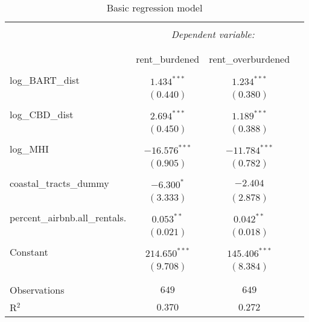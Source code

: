 \documentclass[10pt, letterpaper]{amsart}
\begin{document}
\begin{table}[!htbp] \centering 
  \caption{Basic regression model} 
  \label{} 
  \begin{tabular}{lccc} 
    \\
    [-1.8ex]        \hline \hline \hline \\
    [-1.8ex]        & \multicolumn{2}{c}{\textit{Dependent variable:}} \\
                                  \cline{2-3}\\     
    \\[-1.8ex]      & rent\_burdened & rent\_overburdened\\ 
                    \hline \\[-1.8ex] 
    
    log\_BART\_dist & $1.434^{***}$   & $1.234^{***}$       \\ 
                    & $(0.440)$       & $(0.380)$           \\ 
    & \\ 
    log\_CBD\_dist  & $2.694^{***}$   & $1.189^{***}$       \\ 
                    & $(0.450)$       & $(0.388)$           \\ 
    & \\ 
    log\_MHI        & $-16.576^{***}$ & $-11.784^{***}$     \\ 
                    & $(0.905)$       & $(0.782)$           \\ 
    & \\ 
    coastal\_tracts\_dummy
                    & $-6.300^*$      & $-2.404$            \\ 
                    & $(3.333)$       & $(2.878)$           \\ 
    & \\ 
    percent\_airbnb.all\_rentals.
                    & $0.053^{**}$    & $0.042^{**}$        \\ 
                    & $(0.021)$       & $(0.018)$           \\ 
    & \\ 
    Constant        & $214.650^{***}$ & $145.406^{***}$     \\ 
                    & $(9.708)$       & $(8.384)$           \\ 
    & \\ 
                    \hline \\[-1.8ex] 
    Observations    & $649$           & $649$               \\ 
    R$^{2}$         & $0.370$         & $0.272$             \\ 

\end{tabular}
\end{table}
\end{document}
